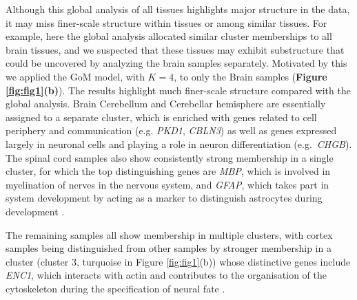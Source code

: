 Although this global analysis of all tissues highlights major structure in the data, it may miss finer-scale structure within tissues or among similar tissues. For example, here the global analysis allocated similar cluster memberships to all brain tissues,  and we suspected that these tissues may exhibit substructure that could be uncovered by analyzing the brain samples separately. Motivated by this we applied the GoM model, with $K=4$, to only the Brain samples (\textbf{Figure \ref{fig:fig1}(b)}). The results highlight much finer-scale structure compared with the global analysis. Brain Cerebellum and Cerebellar hemisphere are essentially assigned to a separate cluster, which is enriched with genes related to cell periphery and communication (e.g. \textit{PKD1}, \textit{CBLN3}) as well as genes expressed largely in neuronal cells and playing a role in neuron differentiation (e.g.~\textit{CHGB}). The spinal cord samples also show consistently strong membership in a single cluster, for which the top distinguishing genes are \textit{MBP}, which is involved in myelination of nerves in the nervous system\cite{Hu2016}, and \textit{GFAP}, which takes part in system development by acting as a marker to distinguish astrocytes during development \cite{}. 



The remaining samples all show membership in multiple clusters, with cortex samples being distinguished from other samples by stronger membership in a cluster (cluster 3, turquoise in Figure \ref{fig:fig1}(b)) whose distinctive genes include \textit{ENC1}, which  interacts with actin and contributes to the organisation of the cytoskeleton during the specification of neural fate \cite{Hernandez1997}.



